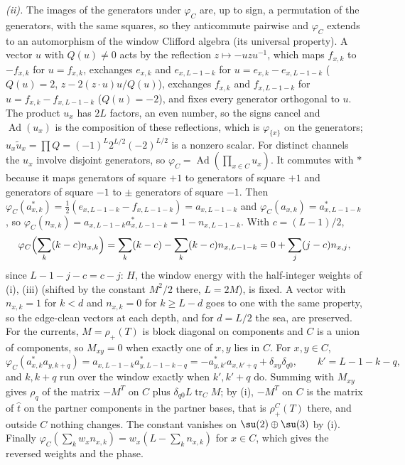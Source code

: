 \emph{(ii).} The images of the generators under $\varphi_{C}$ are, up to sign, a permutation of the generators, with the same squares, so they anticommute pairwise and $\varphi_{C}$ extends to an automorphism of the window Clifford algebra (its universal property). A vector $u$ with $Q(u) \ne 0$ acts by the reflection $z \mapsto -uzu^{-1}$, which maps $f_{x,k}$ to $-f_{x,k}$ for $u = f_{x,k}$, exchanges $e_{x,k}$ and $e_{x,L-1-k}$ for $u = e_{x,k} - e_{x,L-1-k}$ ($Q(u) = 2$, $z - 2(z\cdot u)u/Q(u)$), exchanges $f_{x,k}$ and $f_{x,L-1-k}$ for $u = f_{x,k} - f_{x,L-1-k}$ ($Q(u) = -2$), and fixes every generator orthogonal to $u$. The product $u_{x}$ has $2L$ factors, an even number, so the signs cancel and $\operatorname{Ad}(u_{x})$ is the composition of these reflections, which is $\varphi_{\{x\}}$ on the generators; $u_{x}\tilde u_{x} = \prod Q = (-1)^{L}2^{L/2}(-2)^{L/2}$ is a nonzero scalar. For distinct channels the $u_{x}$ involve disjoint generators, so $\varphi_{C} = \operatorname{Ad}(\prod_{x \in C}u_{x})$. It commutes with $*$ because it maps generators of square $+1$ to generators of square $+1$ and generators of square $-1$ to $\pm$ generators of square $-1$. Then $\varphi_{C}(a^{*}_{x,k}) = \tfrac12(e_{x,L-1-k} - f_{x,L-1-k}) = a_{x,L-1-k}$ and $\varphi_{C}(a_{x,k}) = a^{*}_{x,L-1-k}$, so $\varphi_{C}(n_{x,k}) = a_{x,L-1-k}a^{*}_{x,L-1-k} = 1 - n_{x,L-1-k}$. With $c = (L - 1)/2$,
\[
\varphi_{C}\Bigl(\sum_{k}(k - c)n_{x,k}\Bigr) = \sum_{k}(k - c) - \sum_{k}(k - c)n_{x,L-1-k} = 0 + \sum_{j}(j - c)n_{x,j},
\]
since $L - 1 - j - c = c - j$: $H$, the window energy with the half-integer weights of (i), (iii) (shifted by the constant $M^{2}/2$ there, $L = 2M$), is fixed. A vector with $n_{x,k} = 1$ for $k < d$ and $n_{x,k} = 0$ for $k \ge L - d$ goes to one with the same property, so the edge-clean vectors at each depth, and for $d = L/2$ the sea, are preserved. For the currents, $M = \rho_{+}(T)$ is block diagonal on components and $C$ is a union of components, so $M_{xy} = 0$ when exactly one of $x, y$ lies in $C$. For $x, y \in C$,
\[
\varphi_{C}(a^{*}_{x,k}a_{y,k+q}) = a_{x,L-1-k}a^{*}_{y,L-1-k-q} = -a^{*}_{y,k'}a_{x,k'+q} + \delta_{xy}\delta_{q0}, \qquad k' = L - 1 - k - q,
\]
and $k, k + q$ run over the window exactly when $k', k' + q$ do. Summing with $M_{xy}$ gives $\rho_{q}$ of the matrix $-M^{T}$ on $C$ plus $\delta_{q0}L\operatorname{tr}_{C}M$; by (i), $-M^{T}$ on $C$ is the matrix of $\hat t$ on the partner components in the partner bases, that is $\rho_{+}^{C}(T)$ there, and outside $C$ nothing changes. The constant vanishes on $\su(2) \oplus \su(3)$ by (i). Finally $\varphi_{C}(\sum_{k}w_{x}n_{x,k}) = w_{x}(L - \sum_{k}n_{x,k})$ for $x \in C$, which gives the reversed weights and the phase.

